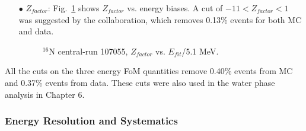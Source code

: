 \begin{itemize}
	\item[$\bullet$]$Z_{factor}$:
	Fig.~\ref{energyFOM_Zfactor} shows $Z_{factor}$ vs. energy biases. A cut of $-11<Z_{factor}<1$ was suggested by the collaboration, which removes 0.13\% events for both MC and data.		
	\begin{figure}[!htb]
		\centering
		\caption{$^{16}$N central-run 107055, $Z_{factor}$ vs. $E_{fit}$/5.1 MeV.\label{energyFOM_Zfactor}}
		
	\end{figure}
	
	
\end{itemize}

All the cuts on the three energy FoM quantities remove 0.40\% events from MC and 0.37\% events from data. These cuts were also used in the water phase analysis in Chapter 6.

\subsubsection{Energy Resolution and Systematics} \label{sect:energySystematics}

